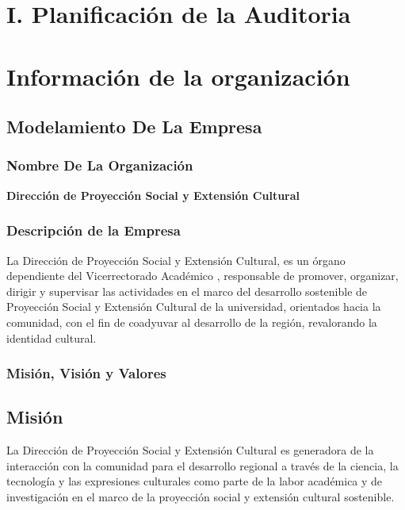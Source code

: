 \documentclass[12pt,a4paper]{article}
\begin{document}

\tableofcontents %
\pagestyle{fancy} \mystyle \newpage %
\newcommand{\dpsec}{Dirección de Proyección Social y Extensión Cultural}


\section{I. Planificación de la Auditoria}

\section*{Información de la organización}
\subsection*{Modelamiento De La Empresa}
\subsubsection*{Nombre De La Organización}
\textbf{\dpsec}

\subsubsection*{Descripción de la Empresa}
La Dirección de Proyección Social y Extensión Cultural, es un órgano dependiente del Vicerrectorado Académico \cite{mysql}, responsable de promover, organizar, dirigir y supervisar las actividades en el marco del desarrollo sostenible de Proyección Social y Extensión Cultural de la universidad, orientados hacia la comunidad, con el fin de coadyuvar al desarrollo de la región, revalorando la identidad cultural.

\subsubsection*{Misión, Visión y Valores}
\subsection*{Misión}
La Dirección de Proyección Social y Extensión Cultural es generadora de la interacción con la comunidad para el desarrollo regional a través de la ciencia, la tecnología y las expresiones culturales como parte de la labor académica y de investigación en el marco de la proyección social y extensión cultural sostenible.
\end{document}
